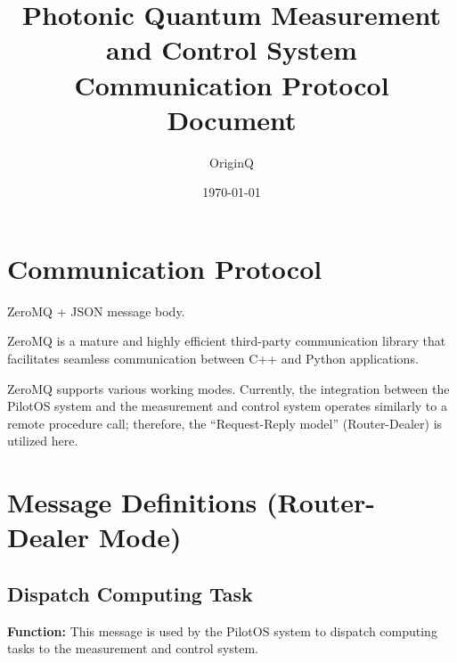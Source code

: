 \documentclass[12pt, a4paper]{article}
\title{\textbf{Photonic Quantum Measurement and Control System Communication Protocol Document}}
\author{OriginQ}
\date{\today}
\begin{document}
\maketitle
\tableofcontents
\newpage

\section{Communication Protocol}

ZeroMQ + JSON message body.

ZeroMQ is a mature and highly efficient third-party communication library that facilitates seamless communication between C++ and Python applications.

ZeroMQ supports various working modes. Currently, the integration between the PilotOS system and the measurement and control system operates similarly to a remote procedure call; therefore, the ``Request-Reply model'' (Router-Dealer) is utilized here.

\section{Message Definitions (Router-Dealer Mode)}

\subsection{Dispatch Computing Task}

\textbf{Function:} This message is used by the PilotOS system to dispatch computing tasks to the measurement and control system.
\end{document}
